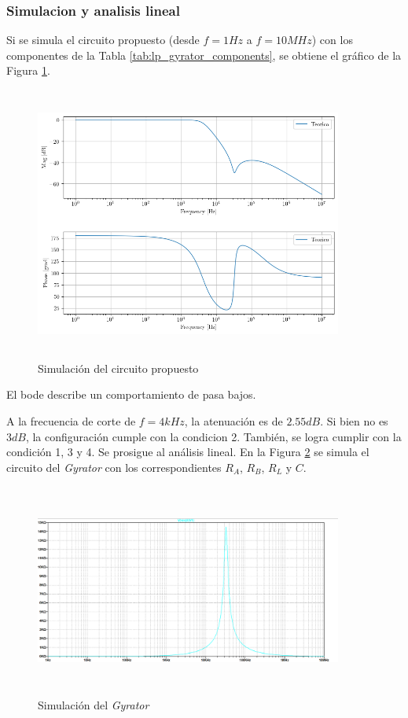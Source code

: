 \subsubsection{Simulacion y analisis lineal}
Si se simula el circuito propuesto (desde $f = 1 Hz$ a $f = 10MHz$) con los componentes de la Tabla \ref{tab:lp_gyrator_components}, se obtiene el gráfico de la Figura \ref{ej2_lp_sim}.

\begin{figure}[h!]                                                       
\centering\includegraphics[width=0.9\textwidth, height=9cm]{../Ex2/Resources/ej2_lp_sim.png}
\caption{Simulación del circuito propuesto }
\label{ej2_lp_sim}
\end{figure}

El bode describe un comportamiento de pasa bajos. 


A la frecuencia de corte de $f= 4kHz$, la atenuación es de $2.55 dB$. Si bien no es $3dB$, la configuración cumple con la condicion 2.  También, se logra cumplir con la condición 1, 3 y 4. Se prosigue al análisis lineal. En la Figura \ref{fig:ej2_LP_gyrator_sim} se simula el circuito del \textit{Gyrator} con los correspondientes  $R_A$, $R_B$,  $R_L$ y $C$.



\begin{figure}[h!]                                                       
\centering\includegraphics[width=0.9\textwidth, height=7cm]{../Ex2/Resources/ej2_lp_gyrator_sim.png}
\caption{Simulación del \textit{Gyrator} }
\label{fig:ej2_LP_gyrator_sim}
\end{figure}

